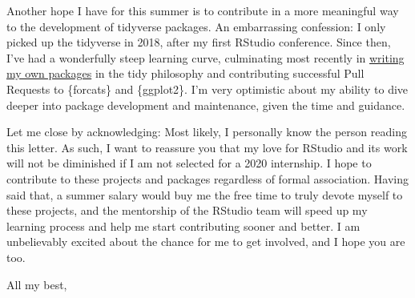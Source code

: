 \documentclass[10pt, a4paper]{letter} %
\begin{document}
\begin{letter}{
}
Another hope I have for this summer is to contribute in a more meaningful way to the development of tidyverse packages.  An embarrassing confession:  I only picked up the tidyverse in 2018, after my first RStudio conference.  Since then, I've had a wonderfully steep learning curve, culminating most recently in \href{https://github.com/kbodwin/flair}{writing my own packages} in the tidy philosophy and contributing successful Pull Requests to \{forcats\} and \{ggplot2\}.  I'm very optimistic about my ability to dive deeper into package development and maintenance, given the time and guidance.

Let me close by acknowledging: Most likely, I personally know the person reading this letter.  As such, I want to reassure you that my love for RStudio and its work will not be diminished if I am not selected for a 2020 internship.  I hope to contribute to these projects and packages regardless of formal association.  Having said that, a summer salary would buy me the free time to truly devote myself to these projects, and the mentorship of the RStudio team will speed up my learning process and help me start contributing sooner and better.  I am unbelievably excited about the chance for me to get involved, and I hope you are too.

\closing{All my best,}




\end{letter}
\end{document}
